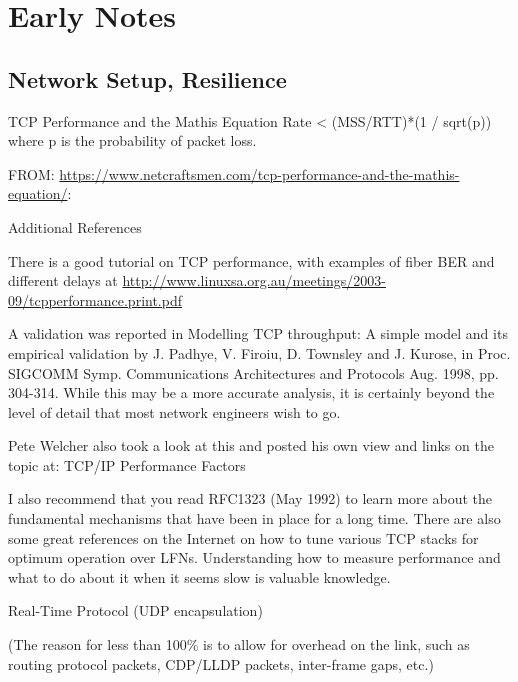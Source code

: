 


%
%


\chapter{Early Notes}

\section{Network Setup, Resilience}

TCP Performance and the Mathis Equation\cite{mathis1997macroscopic}\nl%
Rate < (MSS/RTT)*(1 / sqrt(p))\nl%
where p is the probability of packet loss.

\wdiv%
FROM: \url{https://www.netcraftsmen.com/tcp-performance-and-the-mathis-equation/}:

Additional References

There is a good tutorial on TCP performance, with examples of fiber BER and different delays at\nl%
\url{http://www.linuxsa.org.au/meetings/2003-09/tcpperformance.print.pdf}

A validation was reported in Modelling TCP throughput: A simple model and its empirical validation by J. Padhye, V. Firoiu, D. Townsley and J. Kurose, in Proc. SIGCOMM Symp. Communications Architectures and Protocols Aug. 1998, pp. 304-314.  While this may be a more accurate analysis, it is certainly beyond the level of detail that most network engineers wish to go.

Pete Welcher also took a look at this and posted his own view and links on the topic at:  TCP/IP Performance Factors

I also recommend that you read RFC1323 (May 1992) to learn more about the fundamental mechanisms that have been in place for a long time.  There are also some great references on the Internet on how to tune various TCP stacks for optimum operation over LFNs.  Understanding how to measure performance and what to do about it when it seems slow is valuable knowledge.


\wdiv%
Real-Time Protocol  (UDP encapsulation)

(The reason for less than 100\% is to allow for overhead on the link, such as routing protocol packets, CDP/LLDP packets, inter-frame gaps, etc.)



\wdiv%



